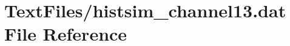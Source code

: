 \hypertarget{TextFiles_2histsim__channel13_8dat}{}\section{Text\+Files/histsim\+\_\+channel13.dat File Reference}
\label{TextFiles_2histsim__channel13_8dat}
